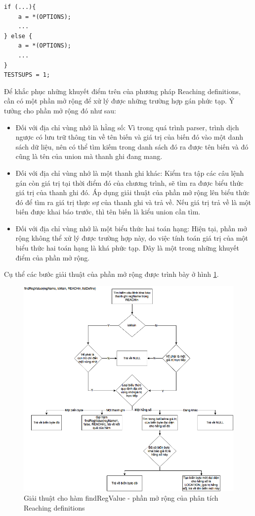 \begin{lstlisting}[caption={Đoạn mã có nhiều câu lệnh khai báo cho ACC đến được một điểm của chương trình nhưng tất cả đều cùng giá trị},label={list:ifcond}]
if (...){
	a = *(OPTIONS);
	...
} else {
	a = *(OPTIONS);
	...
}
TESTSUPS = 1;
\end{lstlisting}
Để khắc phục những khuyết điểm trên của phương pháp Reaching definitions, cần có một phần mở rộng để xử lý được những trường hợp gán phức tạp. Ý tưởng cho phần mở rộng đó như sau:
\begin{itemize}
	\item Đối với địa chỉ vùng nhớ là hằng số: Vì trong quá trình parser, trình dịch ngược có lưu trữ thông tin về tên biến và giá trị của biến đó vào một danh sách dữ liệu, nên có thể tìm kiếm trong danh sách đó ra được tên biến và đó cũng là tên của union mà thanh ghi đang mang.
	\item Đối với địa chỉ vùng nhớ là một thanh ghi khác: Kiểm tra tập các câu lệnh gán còn giá trị tại thời điểm đó của chương trình, sẽ tìm ra được biểu thức giá trị của thanh ghi đó. Áp dụng giải thuật của phần mở rộng lên biểu thức đó để tìm ra giá trị thực sự của thanh ghi và trả về. Nếu giá trị trả về là một biến được khai báo trước, thì tên biến là kiểu union cần tìm.
	\item Đối với địa chỉ vùng nhớ là một biểu thức hai toán hạng: Hiện tại, phần mở rộng không thể xử lý được trường hợp này, do việc tính toán giá trị của một biểu thức hai toán hạng là khá phức tạp. Đây là một trong những khuyết điểm của phần mở rộng.
\end{itemize}
Cụ thể các bước giải thuật của phần mở rộng được trình bày ở hình \ref{fig:reachdefextendalgo}.
\begin{figure}
	\centering
	\includegraphics[width=\linewidth]{image/reachdefextendalgo}
	\caption{Giải thuật cho hàm findRegValue - phần mở rộng của phân tích Reaching definitions}
	\label{fig:reachdefextendalgo}
\end{figure}

